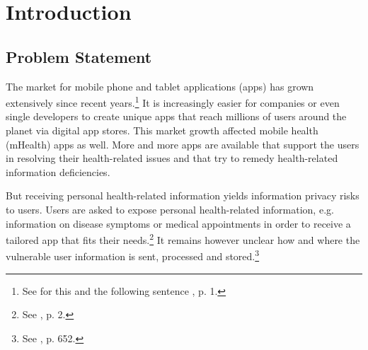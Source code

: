 \section{Introduction}

\subsection{Problem Statement}

The market for mobile phone and tablet applications (apps) has grown extensively since recent years.\footnote{See for this and the following sentence \cite{Enck2011}, p. 1.}
It is increasingly easier for companies or even single developers to create unique apps that reach millions of users around the planet via digital app stores.
This market growth affected mobile health (\acs{mHealth}) apps as well. 
More and more \mH apps are available that support the users in resolving their health-related issues and that try to remedy health-related information deficiencies. 

But receiving personal health-related information yields information privacy risks to users.
Users are asked to expose personal health-related information, e.g. information on disease symptoms or medical appointments in order to receive a tailored app that fits their needs.\footnote{See \cite{Chen2012}, p. 2.}
It remains however unclear how and where the vulnerable user information is sent, processed and stored.\footnote{See \cite{He2014}, p. 652.}

